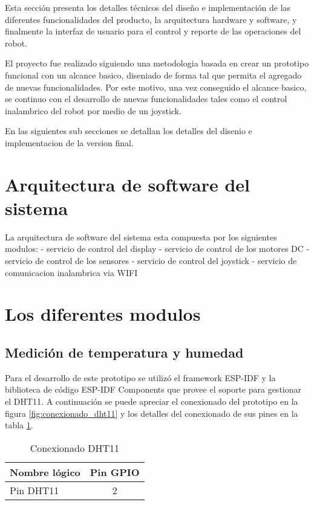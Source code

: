 
Esta sección presenta los detalles técnicos del diseño e implementación de las diferentes funcionalidades del producto, la arquitectura hardware y software, y finalmente la interfaz de usuario para el control y reporte de las operaciones del robot.

El proyecto fue realizado siguiendo una metodologia basada en crear un prototipo funcional con un alcance basico, diseniado de forma tal que permita el agregado de nuevas funcionalidades.
Por este motivo, una vez conseguido el alcance basico, se continuo con el desarrollo de nuevas funcionalidades tales como el control inalambrico del robot por medio de un joystick.

En las siguientes sub secciones se detallan los detalles del disenio e implementacion de la version final.

\section{Arquitectura de software del sistema}

La arquitectura de software del sistema esta compuesta por los siguientes modulos:
- servicio de control del display
- servicio de control de los motores DC
- servicio de control de los sensores
- servicio de control del joystick
- servicio de comunicacion inalambrica via WIFI



\section{Los diferentes modulos}
\label{sec:pruebasHW}


\subsection{Medición de temperatura y humedad}

Para el desarrollo de este prototipo se utilizó el framework ESP-IDF y la biblioteca de código ESP-IDF Components que provee el soporte para gestionar el DHT11. A continuación se puede apreciar el conexionado del prototipo en la figura \ref{fig:conexionado_dht11} y los detalles del conexionado de sus pines en la tabla \ref{tab:conexionado_dht11}.


\vspace{0.5cm}
\begin{table}[h]
\centering
\caption[Conexionado DHT11]{Conexionado DHT11}
\begin{tabular}{l c }
\toprule
\textbf{Nombre lógico} &  \textbf{Pin GPIO}\\
\midrule
 Pin DHT11  & 2  \\
\bottomrule
\hline
\end{tabular}
\label{tab:conexionado_dht11} 
\end{table}
 
